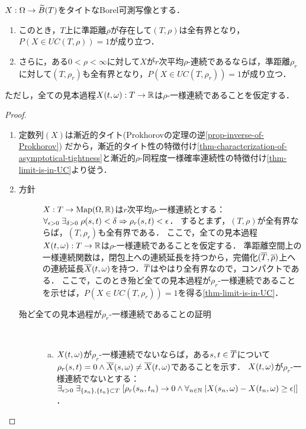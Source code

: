 \documentclass[uplatex,dvipdfmx]{jsreport}
\begin{document}
\begin{lemma}\label{lemma-quasimetric-for-tight-measurable-functions}
    $X:\Omega\to\widetilde{B}(T)$をタイトなBorel可測写像とする．
    \begin{enumerate}
        \item このとき，$T$上に準距離$\rho$が存在して$(T,\rho)$は全有界となり，$P(X\in UC(T,\rho))=1$が成り立つ．
        \item さらに，ある$0<\rho<\infty$に対して$X$が$r$次平均$\rho$-連続であるならば，準距離$\rho_r$に対して$(T,\rho_r)$も全有界となり，$P(X\in UC(T,\rho_r))=1$が成り立つ．
    \end{enumerate}
    ただし，全ての見本過程$X(t,\omega):T\to\mathbb{R}$は$\rho$-一様連続であることを仮定する．
\end{lemma}
\begin{proof}\mbox{}
    \begin{enumerate}
        \item 定数列$(X)$は漸近的タイト(Prokhorovの定理の逆\ref{prop-inverse-of-Prokhorov})
        だから，漸近的タイト性の特徴付け\ref{thm-characterization-of-asymptotical-tightness}と漸近的$\rho$-同程度一様確率連続性の特徴付け\ref{thm-limit-is-in-UC}より従う．
        \item \begin{description}
            \item[方針] $X:T\to\mathrm{Map}(\Omega,\mathbb{R})$は$r$次平均$\rho$-一様連続とする：$\forall_{\epsilon>0}\;\exists_{\delta>0}\;\rho(s,t)<\delta\Rightarrow\rho_r(s,t)<\epsilon$．
            するとまず，$(T,\rho)$が全有界ならば，$(T,\rho_r)$も全有界である．
            ここで，全ての見本過程$X(t,\omega):T\to\mathbb{R}$は$\rho$-一様連続であることを仮定する．
            準距離空間上の一様連続関数は，閉包上への連続延長を持つから，完備化$(\overline{T},\overline{\rho})$上への連続延長$\overline{X}(t,\omega)$を持つ．$\overline{T}$はやはり全有界なので，コンパクトである．
            ここで，このとき殆ど全ての見本過程が$\rho_r$-一様連続であることを示せば，$P(X\in UC(T,\rho_r))=1$を得る\ref{thm-limit-is-in-UC}．
            \item[殆ど全ての見本過程が$\rho_r$-一様連続であることの証明] \mbox{}\\
            \begin{enumerate}[(a)]
                \item $X(t,\omega)$が$\rho_r$-一様連続でないならば，ある$s,t\in\overline{T}$について$\rho_r(s,t)=0\land \overline{X}(s,\omega)\ne\overline{X}(t,\omega)$であることを示す．
                $X(t,\omega)$が$\rho_r$-一様連続でないとする：$\exists_{\epsilon>0}\;\exists_{\{s_n\},\{t_n\}\subset T}\;[\rho_r(s_n,t_n)\to 0\land\forall_{n\in\mathbb{N}}\;\lvert X(s_n,\omega)-X(t_n,\omega)\ge\epsilon\rvert]$．

\end{enumerate}
\end{description}
\end{enumerate}
\end{proof}
\end{document}
